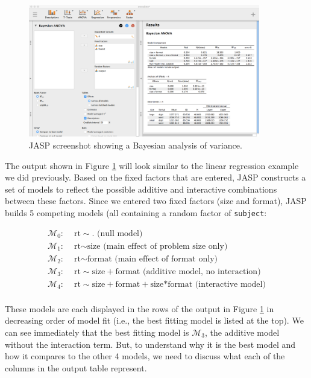 \documentclass[english,,doc,floatsintext]{apa6}
\begin{document}
\begin{figure}
\centering
\includegraphics[width=0.9\textwidth,height=\textheight]{figures/anovaBayes.png}
\caption{\label{fig:anovaBayes}JASP screenshot showing a Bayesian analysis of variance.}
\end{figure}

The output shown in Figure \ref{fig:anovaBayes} will look similar to the linear regression example we did previously. Based on the fixed factors that are entered, JASP constructs a set of models to reflect the possible additive and interactive combinations between these factors. Since we entered two fixed factors (size and format), JASP builds 5 competing models (all containing a random factor of \texttt{subject}:

\begin{align*}
  \mathcal{M}_0: & \text{ rt} \sim . \text{ (null model)}\\
  \mathcal{M}_1: & \text{ rt} \sim \text{size} \text{ (main effect of problem size only)}\\
  \mathcal{M}_2: & \text{ rt} \sim \text{format} \text{ (main effect of format only)}\\
  \mathcal{M}_3: & \text{ rt} \sim \text{size}+\text{format} \text{ (additive model, no interaction)}\\
  \mathcal{M}_4: & \text{ rt} \sim \text{size}+\text{format}+\text{size*format} \text{ (interactive model)}\\
\end{align*}

These models are each displayed in the rows of the output in Figure \ref{fig:anovaBayes} in decreasing order of model fit (i.e., the best fitting model is listed at the top). We can see immediately that the best fitting model is \(\mathcal{M}_3\), the additive model without the interaction term. But, to understand why it is the best model and how it compares to the other 4 models, we need to discuss what each of the columns in the output table represent.
\end{document}
